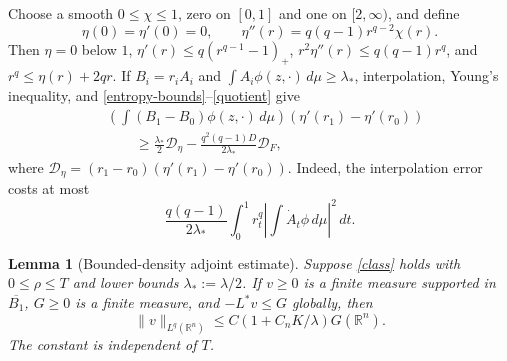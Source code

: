 \documentclass{article}
\newtheorem{lemma}{Lemma}
\newcommand{\R}{\mathbb R}
\newcommand{\dd}{\,d}
\begin{document}
Choose a smooth $0\le\chi\le1$, zero on $[0,1]$ and one on $[2,\infty)$, and define
\[
 \eta(0)=\eta'(0)=0,\qquad\eta''(r)=q(q-1)r^{q-2}\chi(r).
\]
Then $\eta=0$ below $1$, $\eta'(r)\le q(r^{q-1}-1)_+$, $r^2\eta''(r)\le q(q-1)r^q$, and $r^q\le\eta(r)+2qr$.
If $B_i=r_iA_i$ and $\int A_i\phi(z,\cdot)\dd\mu\ge\lambda_*$, interpolation, Young's inequality, and \eqref{entropy-bounds}--\eqref{quotient} give
\begin{equation}\label{two-point}
 \begin{split}
 &\left(\int(B_1-B_0)\phi(z,\cdot)\dd\mu\right)
       (\eta'(r_1)-\eta'(r_0))\\
 &\qquad\ge\frac{\lambda_*}{2}\mathcal D_\eta
       -\frac{q^2(q-1)D}{2\lambda_*}\mathcal D_F,
 \end{split}
\end{equation}
where $\mathcal D_\eta=(r_1-r_0)(\eta'(r_1)-\eta'(r_0))$. Indeed, the interpolation error costs at most
\[
 \frac{q(q-1)}{2\lambda_*}
 \int_0^1 r_t^q\left|\int\dot A_t\phi\dd\mu\right|^2\dd t.
\]

\begin{lemma}[Bounded-density adjoint estimate]\label{adjoint}
Suppose \eqref{class} holds with $0\le\rho\le T$ and lower bounds $\lambda_*:=\lambda/2$. If $v\ge0$ is a finite measure supported in $\overline{B_1}$, $G\ge0$ is a finite measure, and $-L^*v\le G$ globally, then
\[
 \|v\|_{L^q(\R^n)}\le C(1+C_nK/\lambda)G(\R^n).
\]
The constant is independent of $T$.
\end{lemma}
\end{document}

